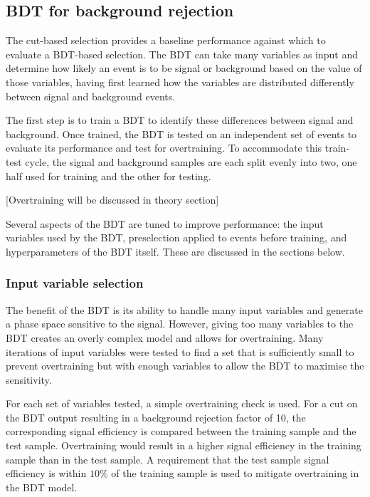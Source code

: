 \subsection{\acs{BDT} for background rejection}

The cut-based selection provides a baseline performance against which to
evaluate a \ac{BDT}-based selection. The \ac{BDT} can take many variables as
input and determine how likely an event is to be signal or background based on
the value of those variables, having first learned how the variables are
distributed differently between signal and background events.

The first step is to train a \ac{BDT} to identify these differences between
signal and background. Once trained, the \ac{BDT} is tested on an independent
set of events to evaluate its performance and test for overtraining.
To accommodate this train-test cycle, the signal and background samples are each
split evenly into two, one half used for training and the other for testing.

[Overtraining will be discussed in theory section]

Several aspects of the \ac{BDT} are tuned to improve performance: the input
variables used by the \ac{BDT}, preselection applied to events before training,
and hyperparameters of the \ac{BDT} itself. These are discussed in the sections
below.

\subsubsection{Input variable selection}
\label{sec:vzy-bdt-variables}

The benefit of the \ac{BDT} is its ability to handle many input variables and
generate a phase space sensitive to the signal. However, giving too many
variables to the \ac{BDT} creates an overly complex model and allows for
overtraining. Many iterations of input variables were tested to find a set that
is sufficiently small to prevent overtraining but with enough variables to allow
the \ac{BDT} to maximise the sensitivity.

For each set of variables tested, a simple overtraining check is used. For a
cut on the \ac{BDT} output resulting in a background rejection factor of 10, the
corresponding signal efficiency is compared between the training sample and the
test sample. Overtraining would result in a higher signal efficiency in the
training sample than in the test sample. A requirement that the test sample
signal efficiency is within $10\%$ of the training sample is used to mitigate
overtraining in the \ac{BDT} model.

